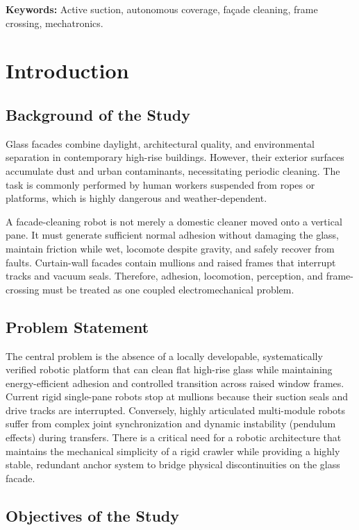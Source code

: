 \documentclass[12pt, a4paper]{article}
\begin{document}
\textbf{Keywords:} Active suction, autonomous coverage, façade cleaning, frame crossing, mechatronics.

\newpage

\section{Introduction}

\subsection{Background of the Study}
Glass facades combine daylight, architectural quality, and environmental separation in contemporary high-rise buildings. However, their exterior surfaces accumulate dust and urban contaminants, necessitating periodic cleaning. The task is commonly performed by human workers suspended from ropes or platforms, which is highly dangerous and weather-dependent. 

A facade-cleaning robot is not merely a domestic cleaner moved onto a vertical pane. It must generate sufficient normal adhesion without damaging the glass, maintain friction while wet, locomote despite gravity, and safely recover from faults. Curtain-wall facades contain mullions and raised frames that interrupt tracks and vacuum seals. Therefore, adhesion, locomotion, perception, and frame-crossing must be treated as one coupled electromechanical problem.

\subsection{Problem Statement}
The central problem is the absence of a locally developable, systematically verified robotic platform that can clean flat high-rise glass while maintaining energy-efficient adhesion and controlled transition across raised window frames. Current rigid single-pane robots stop at mullions because their suction seals and drive tracks are interrupted. Conversely, highly articulated multi-module robots suffer from complex joint synchronization and dynamic instability (pendulum effects) during transfers. There is a critical need for a robotic architecture that maintains the mechanical simplicity of a rigid crawler while providing a highly stable, redundant anchor system to bridge physical discontinuities on the glass facade.

\subsection{Objectives of the Study}
\end{document}
